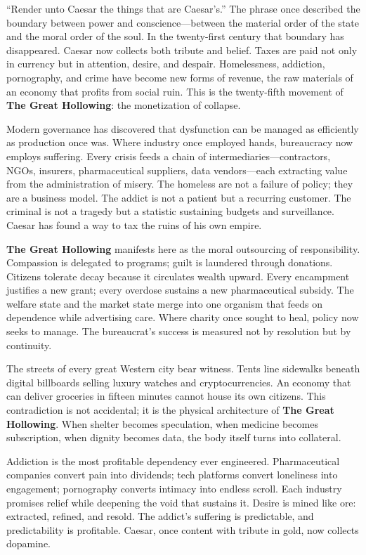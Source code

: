 \documentclass[11pt,twoside]{book}
\begin{document}
“Render unto Caesar the things that are Caesar’s.”  
The phrase once described the boundary between power and conscience—between the material order of the state and the moral order of the soul.  
In the twenty-first century that boundary has disappeared.  Caesar now collects both tribute and belief.  
Taxes are paid not only in currency but in attention, desire, and despair.  
Homelessness, addiction, pornography, and crime have become new forms of revenue, the raw materials of an economy that profits from social ruin.  
This is the twenty-fifth movement of \textbf{The Great Hollowing}: the monetization of collapse.

Modern governance has discovered that dysfunction can be managed as efficiently as production once was.  
Where industry once employed hands, bureaucracy now employs suffering.  
Every crisis feeds a chain of intermediaries—contractors, NGOs, insurers, pharmaceutical suppliers, data vendors—each extracting value from the administration of misery.  
The homeless are not a failure of policy; they are a business model.  
The addict is not a patient but a recurring customer.  
The criminal is not a tragedy but a statistic sustaining budgets and surveillance.  
Caesar has found a way to tax the ruins of his own empire.

\textbf{The Great Hollowing} manifests here as the moral outsourcing of responsibility.  
Compassion is delegated to programs; guilt is laundered through donations.  
Citizens tolerate decay because it circulates wealth upward.  
Every encampment justifies a new grant; every overdose sustains a new pharmaceutical subsidy.  
The welfare state and the market state merge into one organism that feeds on dependence while advertising care.  
Where charity once sought to heal, policy now seeks to manage.  
The bureaucrat’s success is measured not by resolution but by continuity.

The streets of every great Western city bear witness.  
Tents line sidewalks beneath digital billboards selling luxury watches and cryptocurrencies.  
An economy that can deliver groceries in fifteen minutes cannot house its own citizens.  
This contradiction is not accidental; it is the physical architecture of \textbf{The Great Hollowing}.  
When shelter becomes speculation, when medicine becomes subscription, when dignity becomes data, the body itself turns into collateral.

Addiction is the most profitable dependency ever engineered.  
Pharmaceutical companies convert pain into dividends; tech platforms convert loneliness into engagement; pornography converts intimacy into endless scroll.  
Each industry promises relief while deepening the void that sustains it.  
Desire is mined like ore: extracted, refined, and resold.  
The addict’s suffering is predictable, and predictability is profitable.  
Caesar, once content with tribute in gold, now collects dopamine.
\end{document}
